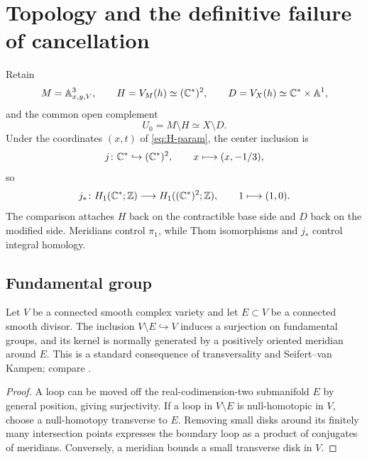 \section{Topology and the definitive failure of cancellation}\label{sec:topology}

\begin{setup}\label{setup:topology-common-complement}
Retain
\[
  M=\mathbb A^3_{x,y,V},
  \qquad
  H=V_M(h)\simeq(\mathbb C^*)^2,
  \qquad
  D=V_X(h)\simeq\mathbb C^*\times\mathbb A^1,
\]
and the common open complement
\[
  U_0=M\setminus H\simeq X\setminus D.
\]
Under the coordinates $(x,t)$ of \eqref{eq:H-param}, the center inclusion is
\begin{equation}\label{eq:center-inclusion}
  j\colon\mathbb C^*\hookrightarrow(\mathbb C^*)^2,
  \qquad
  x\longmapsto(x,-1/3),
\end{equation}
so
\begin{equation}\label{eq:H1-inclusion}
  j_*\colon H_1(\mathbb C^*;\mathbb Z)\longrightarrow H_1((\mathbb C^*)^2;\mathbb Z),
  \qquad
  1\longmapsto(1,0).
\end{equation}
The comparison attaches $H$ back on the contractible base side and $D$ back on the modified side.  Meridians control $\pi_1$, while Thom isomorphisms and $j_*$ control integral homology.
\end{setup}

\subsection{Fundamental group}

\begin{lemma}\label{lem:meridian}
Let $V$ be a connected smooth complex variety and let $E\subset V$ be a connected smooth divisor.  The inclusion $V\setminus E\hookrightarrow V$ induces a surjection on fundamental groups, and its kernel is normally generated by a positively oriented meridian around $E$.  This is a standard consequence of transversality and Seifert--van Kampen; compare \cite[Chapter VI]{Bredon1993}.
\end{lemma}

\begin{proof}
A loop can be moved off the real-codimension-two submanifold $E$ by general position, giving surjectivity.  If a loop in $V\setminus E$ is null-homotopic in $V$, choose a null-homotopy transverse to $E$.  Removing small disks around its finitely many intersection points expresses the boundary loop as a product of conjugates of meridians.  Conversely, a meridian bounds a small transverse disk in $V$.
\end{proof}

